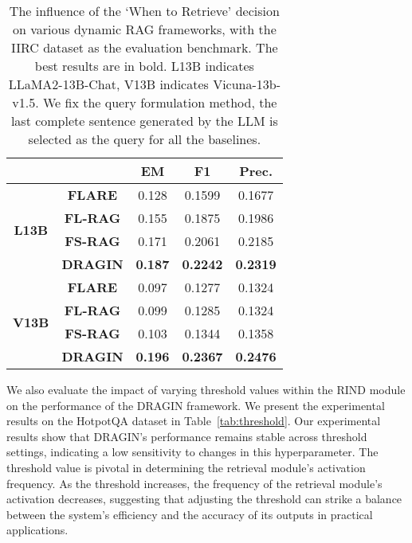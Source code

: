 \begin{table}[]
\caption{The influence of the ‘When to Retrieve’ decision on various dynamic RAG frameworks, with the IIRC dataset as the evaluation benchmark. The best results are in bold. L13B indicates LLaMA2-13B-Chat, V13B indicates Vicuna-13b-v1.5. We fix the query formulation method, the last complete sentence generated by the LLM is selected as the query for all the baselines.}
\label{tab:when}
\centering
\small
\begin{tabular}{ccccc}
\toprule
                               & \textbf{}       & \textbf{EM}    & \textbf{F1}     & \textbf{Prec.}  \\
                               \midrule
\multirow{4}{*}{\textbf{L13B}} & \textbf{FLARE}  & 0.128          & 0.1599          & 0.1677          \\
                               & \textbf{FL-RAG} & 0.155          & 0.1875          & 0.1986          \\
                               & \textbf{FS-RAG} & 0.171          & 0.2061          & 0.2185          \\
                               & \textbf{DRAGIN} & \textbf{0.187} & \textbf{0.2242} & \textbf{0.2319} \\
                               \midrule
\multirow{4}{*}{\textbf{V13B}} & \textbf{FLARE}  & 0.097          & 0.1277          & 0.1324          \\
                               & \textbf{FL-RAG} & 0.099          & 0.1285          & 0.1324          \\
                               & \textbf{FS-RAG} & 0.103          & 0.1344          & 0.1358          \\
                               & \textbf{DRAGIN} & \textbf{0.196} & \textbf{0.2367} & \textbf{0.2476} \\
                               \toprule
\end{tabular}
\end{table}

We also evaluate the impact of varying threshold values within the RIND module on the performance of the DRAGIN framework.
We present the experimental results on the HotpotQA dataset in Table~\ref{tab:threshold}. 
Our experimental results show that DRAGIN's performance remains stable across threshold settings, indicating a low sensitivity to changes in this hyperparameter.
The threshold value is pivotal in determining the retrieval module's activation frequency. 
As the threshold increases, the frequency of the retrieval module's activation decreases, suggesting that adjusting the threshold can strike a balance between the system's efficiency and the accuracy of its outputs in practical applications.


